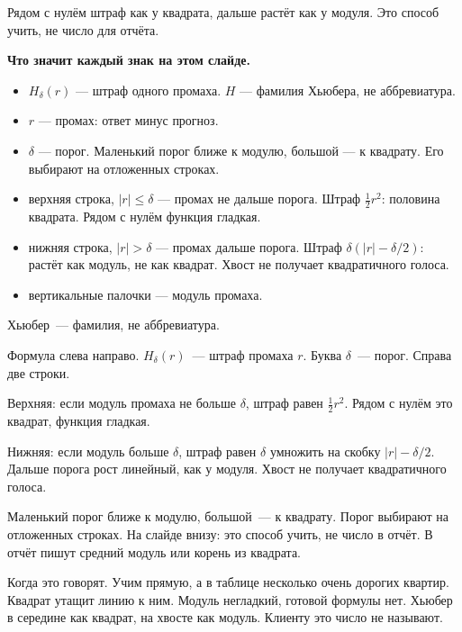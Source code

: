 \documentclass[11pt,a4paper]{article}
\newcommand{\slidehead}[2]{\par\vspace{4mm}{\color{navy}\large\bfseries Слайд #1. #2}\par\vspace{1mm}}
\newcommand{\screen}[1]{\par{\color{ink}\small #1\par}\vspace{1mm}}
\newcommand{\say}[1]{\begin{saybox}#1\end{saybox}}
\newenvironment{signs}{\begin{signbox}{\bfseries Что значит каждый знак на этом слайде.}\par\begin{itemize}[leftmargin=1.15em,itemsep=2pt,topsep=3pt,parsep=0pt]}{\end{itemize}\end{signbox}}
\begin{document}
\slidehead{28}{Хьюбер}
\screen{Рядом с нулём штраф как у квадрата, дальше растёт как у модуля. Это способ учить, не число для отчёта.}
\begin{signs}
\item \(H_{\delta}(r)\) — штраф одного промаха. \(H\) — фамилия Хьюбера, не аббревиатура.
\item \(r\) — промах: ответ минус прогноз.
\item \(\delta\) — порог. Маленький порог ближе к модулю, большой — к квадрату. Его выбирают на отложенных строках.
\item верхняя строка, \(|r|\le\delta\) — промах не дальше порога. Штраф \(\tfrac{1}{2}r^{2}\): половина квадрата. Рядом с нулём функция гладкая.
\item нижняя строка, \(|r|>\delta\) — промах дальше порога. Штраф \(\delta(|r|-\delta/2)\): растёт как модуль, не как квадрат. Хвост не получает квадратичного голоса.
\item вертикальные палочки — модуль промаха.
\end{signs}
\say{Хьюбер~--- фамилия, не аббревиатура.

Формула слева направо. \(H_{\delta}(r)\)~--- штраф промаха \(r\). Буква \(\delta\)~--- порог. Справа две строки.

Верхняя: если модуль промаха не больше \(\delta\), штраф равен \(\tfrac12 r^{2}\). Рядом с нулём это квадрат, функция гладкая.

Нижняя: если модуль больше \(\delta\), штраф равен \(\delta\) умножить на скобку \(|r|-\delta/2\). Дальше порога рост линейный, как у модуля. Хвост не получает квадратичного голоса.

Маленький порог ближе к модулю, большой~--- к квадрату. Порог выбирают на отложенных строках. На слайде внизу: это способ учить, не число в отчёт. В отчёт пишут средний модуль или корень из квадрата.

Когда это говорят. Учим прямую, а в таблице несколько очень дорогих квартир. Квадрат утащит линию к ним. Модуль негладкий, готовой формулы нет. Хьюбер в середине как квадрат, на хвосте как модуль. Клиенту это число не называют.}
\end{document}

